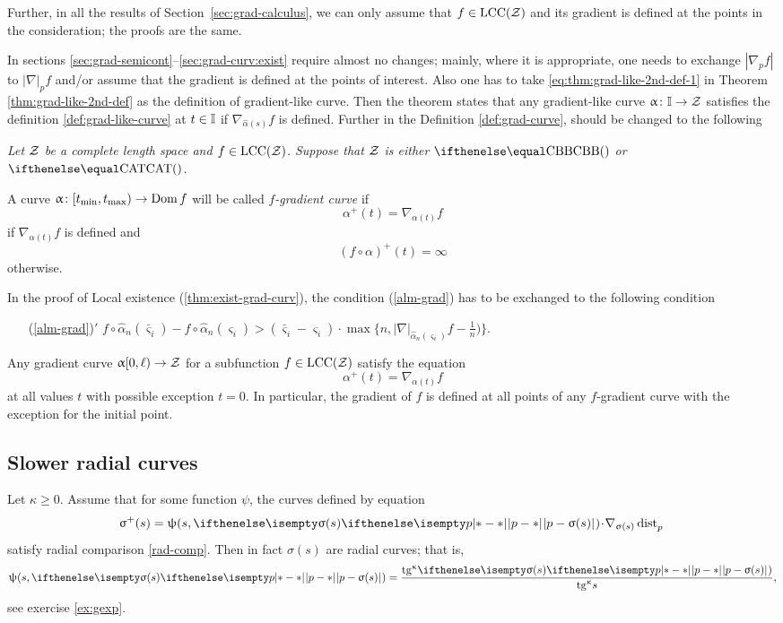 \medskip

Further, in all the results of Section~\ref{sec:grad-calculus}, 
we can only assume that $f\in \LSCSC(\spc{Z})$ and its gradient is defined at the points in the consideration; 
the proofs are the same.

In sections \ref{sec:grad-semicont}--\ref{sec:grad-curv:exist}
require almost no changes;
mainly, where it is appropriate,
one needs to exchange $|\nabla_p f|$ 
to $|\nabla|_pf$ 
and/or assume that the gradient is defined at the points of interest.
Also one has to take \ref{eq:thm:grad-like-2nd-def-1} in Theorem \ref{thm:grad-like-2nd-def}
as the definition of gradient-like curve.
Then the theorem states that any  gradient-like curve $\alpha\:\II\to\spc{Z}$ satisfies the definition \ref{def:grad-like-curve} at $t\in \II$ if $\nabla_{\hat\alpha(s)} f$ is defined.
Further in the Definition \ref{def:grad-curve}, should be changed to the following

\medskip

{\it Let $\mathcal{Z}$ be a complete length space
and $f\in\LSCSC(\spc{Z})$.
Suppose that $\mathcal{Z}$ is either $\Alex{}$ or $\CAT{}$.

A curve 
$\alpha\:[t_{\min},t_{\max})\to\Dom f$ will be called \emph{$f$-gradient curve} if
\[\alpha^+(t)=\nabla_{\alpha(t)} f\]
if $\nabla_{\alpha(t)} f$ is defined and 
\[(f\circ\alpha)^+(t)=\infty\]
otherwise.}

\medskip

In the proof of Local existence (\ref{thm:exist-grad-curv}), the condition (\ref{alm-grad})
has to be exchanged to the following condition
\begin{itemize}

\item[{(\ref{alm-grad})}$'$]
$f\circ\hat\alpha_n(\bar\varsigma_i)-f\circ\hat\alpha_n(\varsigma_i)
>
(\bar\varsigma_i-\varsigma_i)
\cdot
\max\{n,|\nabla|_{\hat\alpha_n(\varsigma_i)}f-\tfrac{1}{n})\}.$
\end{itemize}

Any gradient curve $\alpha[0,\ell)\to\spc{Z}$
for a subfunction
$f\in \LSCSC(\spc{Z})$
satisfy the equation
\[\alpha^+(t)=\nabla_{\alpha(t)} f\]
at all values $t$ with possible exception $t=0$.
In particular, the gradient of $f$ is defined at all points of any 
$f$-gradient curve with the exception for the initial point.

\subsection*{Slower radial curves}
Let $\kappa\ge 0$. 
Assume that for some function $\psi$, the curves defined by equation 
\[\sigma^+(s)=\psi(s,\dist{p}{\sigma(s)}{})\cdot\nabla_{\sigma(s)}\distfun{p}{}{}\]
satisfy radial comparison \ref{rad-comp}.
Then in fact $\sigma(s)$ are radial curves; 
that is, 
\[\psi(s,\dist{p}{\sigma(s)}{})= \frac{\tg\kappa\dist[{{}}]{p}{\sigma(s)}{})}{\tg\kappa s},\]
see exercise \ref{ex:gexp}.

